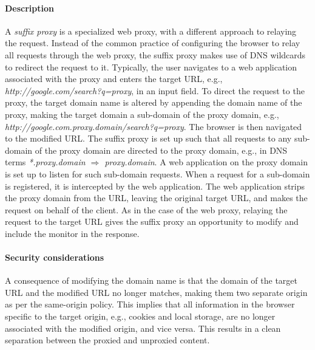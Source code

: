 \documentclass{llncs}
\begin{document}
\paragraph{Description}
A \emph{suffix proxy} is a specialized web proxy, with a different approach to relaying the request. 
Instead of the common practice of configuring the browser to relay all requests through the web proxy,
the suffix proxy makes use of DNS wildcards to redirect the request to it.
Typically, the user navigates to a 
web application associated with the proxy and enters the target URL, e.g., \emph{http://google.com/search?q=proxy}, in 
an input field. To direct the request to the proxy, the target domain name is altered
by appending the domain name of the proxy, making the target domain a sub-domain of the proxy domain, e.g., \emph{http://google.com.proxy.domain/search?q=proxy}. 
The browser is then navigated to the modified URL.
The suffix proxy is set up such
that all requests to any sub-domain of the proxy domain are directed to the proxy domain, 
e.g., in DNS terms \emph{*.proxy.domain $\Rightarrow$ proxy.domain}. 
A web application on the proxy domain is set up to listen for such sub-domain requests.
When a request for a sub-domain is registered, it is intercepted by the web application.
The web application strips the proxy domain from the URL, leaving the original target URL, 
and makes the request on behalf of the client. As in the case of the web proxy, 
relaying the request to the target URL gives the suffix proxy an opportunity to modify and 
include the monitor in the response.








\paragraph{Security considerations}

A consequence of modifying the domain name is that the domain of the
target URL and the modified URL no longer matches, making them two 
separate origin as per the same-origin policy. This implies that all information in 
the browser specific to the target origin, e.g., cookies and local storage, 
are no longer associated with the modified origin, and vice versa. This results 
in a clean separation between the proxied and unproxied content.  
\end{document}
